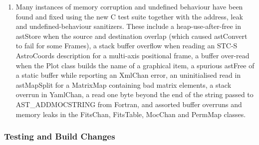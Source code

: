 \documentclass[twoside,11pt]{starlink}
\begin{document}
\begin{enumerate}
\item Many instances of memory corruption and undefined behaviour have been found and fixed using the new C test suite together with the address, leak and undefined-behaviour sanitizers.
  These include a heap-use-after-free in astStore when the source and destination overlap (which caused astConvert to fail for some Frames), a stack buffer overflow when reading an STC-S AstroCoords description for a multi-axis positional frame, a buffer over-read when the Plot class builds the name of a graphical item, a spurious astFree of a static buffer while reporting an XmlChan error, an uninitialised read in astMapSplit for a MatrixMap containing bad matrix elements, a stack overrun in YamlChan, a read one byte beyond the end of the string passed to AST\_ADDMOCSTRING from Fortran, and assorted buffer overruns and memory leaks in the FitsChan, FitsTable, MocChan and PermMap classes.
\end{enumerate}

\subsubsection{Testing and Build Changes}
\end{document}
